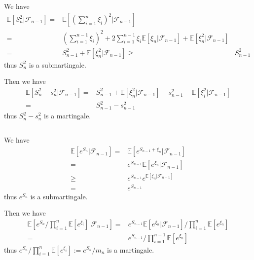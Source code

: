 \documentclass[11pt,a4paper]{ctexart}
\numberwithin{equation}{section}%
\newcommand{\F}{\mathcal{F}}
\begin{document}
\subsection{}

We have
\begin{align*}
    \mathbb{E}\left[ S_n^2 | \F_{n-1} \right] =& \mathbb{E}\left[ (\sum_{i=1}^n \xi _i)^2 | \F_{n-1} \right]  \\
    =& (\sum_{i=1}^{n-1} \xi _i)^2 + 2\sum_{i=1}^{n-1} \xi _i \mathbb{E}\left[ \xi _n | \F_{n-1} \right] + \mathbb{E}\left[ \xi _n^2 | \F_{n-1} \right] \\
    =& S_{n-1}^2 + \mathbb{E}\left[ \xi _n^2 | \F_{n-1} \right]
    \geq & S_{n-1}^2
\end{align*}
thus $ S_n^2 $ is a submartingale.

Then we have
\begin{align*}
    \mathbb{E}\left[ S_n^2-s_n^2 | \F_{n-1} \right] =&   S_{n-1}^2 + \mathbb{E}\left[ \xi _n^2 | \F_{n-1} \right] - s_{n-1}^2 - \mathbb{E}\left[ \xi _i^2 | \F_{n-1} \right] \\
    =& S_{n-1}^2 - s_{n-1}^2 
\end{align*}
thus $ S_n^2-s_n^2 $ is a martingale.


\subsection{}

We have
\begin{align*}
    \mathbb{E}\left[ e^{S_n}| \F_{n-1} \right] =& \mathbb{E}\left[ e^{S_{n-1}+\xi _n} | \F_{n-1} \right] \\
    =& e^{S_{n-1}}\mathbb{E}\left[ e^{\xi _n} | \F_{n-1} \right] \\
    \geq & e^{S_{n-1}} e^{\mathbb{E}\left[ \xi _n | \F_{n-1} \right]} \\
    =& e^{S_{n-1}}
\end{align*}
thus $ e^{S_n} $ is a submartingale.

Then we have 
\begin{align*}
    \mathbb{E}\left[ e^{S_n}/\prod_{i=1}^n\mathbb{E}\left[ e^{\xi _i} \right] | \F_{n-1} \right] =&   e^{S_{n-1}}\mathbb{E}\left[ e^{\xi _n} | \F_{n-1} \right] /\prod_{i=1}^n\mathbb{E}\left[ e^{\xi _n} \right] \\
    =& e^{S_{n-1}}/\prod_{i=1}^{n-1}\mathbb{E}\left[ e^{\xi _n} \right]
\end{align*}
thus $ e^{S_n}/\prod_{i=1}^n\mathbb{E}\left[ e^{\xi _i} \right] := e^{S_n}/m_n $ is a martingale.
\end{document}
